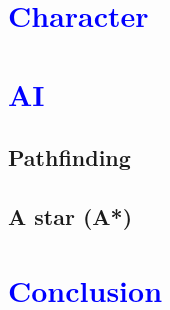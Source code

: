 \documentclass[article]{report} %
\begin{document}
		\chapter{\textcolor{blue}{Character}}

		\chapter{\textcolor{blue}{AI}}
			\section{Pathfinding}
				
			\section{A star (A*)}

		\chapter{\textcolor{blue}{Conclusion}}
				     		
\end{document}
